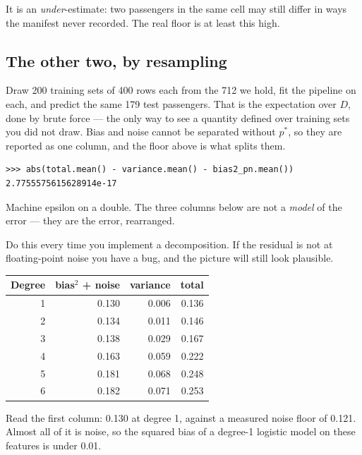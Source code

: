 \documentclass[11pt,a4paper]{article}
\begin{document}
It is an \emph{under}-estimate: two passengers in the same cell may still
differ in ways the manifest never recorded. The real floor is at least this
high.

\subsection{The other two, by resampling}

Draw 200 training sets of 400 rows each from the 712 we hold, fit the pipeline
on each, and predict the same 179 test passengers. That is the expectation over
$D$, done by brute force --- the only way to see a quantity defined over
training sets you did not draw. Bias and noise cannot be separated without
$p^{*}$, so they are reported as one column, and the floor above is what splits
them.

\begin{keybox}[title={Check the identity before believing the plot}]
\begin{verbatim}
>>> abs(total.mean() - variance.mean() - bias2_pn.mean())
2.7755575615628914e-17
\end{verbatim}
Machine epsilon on a double. The three columns below are not a \emph{model} of
the error --- they are the error, rearranged.

Do this every time you implement a decomposition. If the residual is not at
floating-point noise you have a bug, and the picture will still look plausible.
\end{keybox}

\begin{center}
\small
\begin{tabular}{rrrr}
\toprule
\textbf{Degree} & \textbf{bias$^2$ + noise} & \textbf{variance} &
\textbf{total} \\
\midrule
1 & 0.130 & 0.006 & 0.136 \\
2 & 0.134 & 0.011 & 0.146 \\
3 & 0.138 & 0.029 & 0.167 \\
4 & 0.163 & 0.059 & 0.222 \\
5 & 0.181 & 0.068 & 0.248 \\
6 & 0.182 & 0.071 & 0.253 \\
\bottomrule
\end{tabular}
\end{center}

Read the first column: 0.130 at degree 1, against a measured noise floor of
0.121. Almost all of it is noise, so the squared bias of a degree-1 logistic
model on these features is under 0.01.
\end{document}
